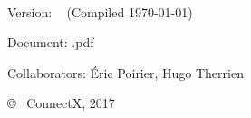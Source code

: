 %

%
%
%
%

~

\vfill


Version: \versionNumber ~ (Compiled \today)

Document: \jobname.pdf

Collaborators: Éric Poirier, Hugo Therrien

\copyright ~ ConnectX, 2017